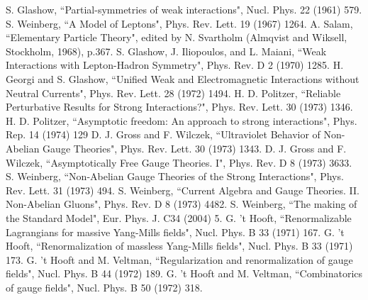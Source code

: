 \documentclass
[
]
{thesis}
\begin{document}
%
%
\begin{thebibliography}{widestlabel}
	 S. Glashow, ``Partial-symmetries of weak interactions", Nucl. Phys. 22 (1961) 579.
	 S. Weinberg, ``A Model of Leptons", Phys. Rev. Lett. 19 (1967) 1264.
	 A. Salam, ``Elementary Particle Theory", edited by N. Svartholm (Almqvist and Wiksell, Stockholm, 1968), p.367.
	 S. Glashow, J. Iliopoulos, and L. Maiani, ``Weak Interactions with Lepton-Hadron Symmetry", Phys. Rev. D 2 (1970) 1285.
	 H. Georgi and S. Glashow, ``Unified Weak and Electromagnetic Interactions without Neutral Currents", Phys. Rev. Lett. 28 (1972) 1494.
	 H. D. Politzer, ``Reliable Perturbative Results for Strong Interactions?", Phys. Rev. Lett. 30 (1973) 1346.
	 H. D. Politzer, ``Asymptotic freedom: An approach to strong interactions", Phys. Rep. 14 (1974) 129	
	 D. J. Gross and F. Wilczek, ``Ultraviolet Behavior of Non-Abelian Gauge Theories", Phys. Rev. Lett. 30 (1973) 1343.
	 D. J. Gross and F. Wilczek, ``Asymptotically Free Gauge Theories. I", Phys. Rev. D 8 (1973) 3633.
	 S. Weinberg, ``Non-Abelian Gauge Theories of the Strong Interactions", Phys. Rev. Lett. 31 (1973) 494.
	 S. Weinberg, ``Current Algebra and Gauge Theories. II. Non-Abelian Gluons", Phys. Rev. D 8 (1973) 4482.
	 S. Weinberg, ``The making of the Standard Model", Eur. Phys. J. C34 (2004) 5.
	 G. 't Hooft, ``Renormalizable Lagrangians for massive Yang-Mills fields", Nucl. Phys. B 33 (1971) 167.
	 G. 't Hooft, ``Renormalization of massless Yang-Mills fields", Nucl. Phys. B 33 (1971) 173.
	 G. 't Hooft and M. Veltman, ``Regularization and renormalization of gauge fields", Nucl. Phys. B 44 (1972) 189.
	  G. 't Hooft and M. Veltman, ``Combinatorics of gauge fields", Nucl. Phys. B 50 (1972) 318.
	

\end{thebibliography}
\end{document}

